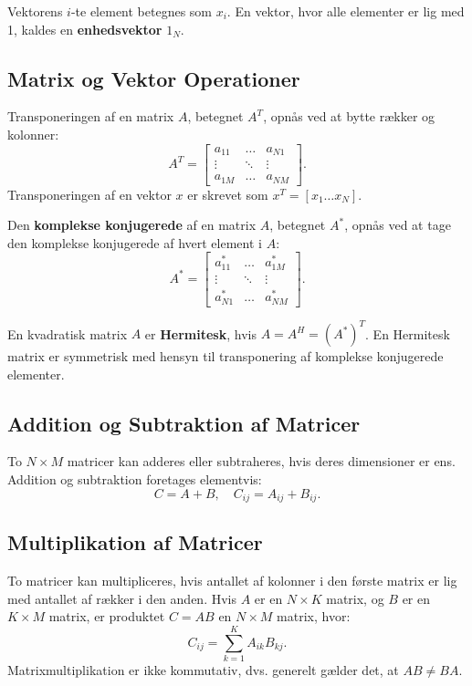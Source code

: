\documentclass[a4paper,12pt]{book}
\begin{document}
	Vektorens \(i\)-te element betegnes som \(x_i\). En vektor, hvor alle elementer er lig med 1, kaldes en \textbf{enhedsvektor} \(1_N\). 
	
	\subsection{Matrix og Vektor Operationer}
	Transponeringen af en matrix \(A\), betegnet \(A^T\), opnås ved at bytte rækker og kolonner:
	\[
	A^T = \begin{bmatrix} 
		a_{11} & \dots & a_{N1} \\
		\vdots & \ddots & \vdots \\
		a_{1M} & \dots & a_{NM} 
	\end{bmatrix}.
	\]
	Transponeringen af en vektor \(x\) er skrevet som \(x^T = [x_1 \dots x_N]\).
	
	Den \textbf{komplekse konjugerede} af en matrix \(A\), betegnet \(A^*\), opnås ved at tage den komplekse konjugerede af hvert element i \(A\):
	\[
	A^* = \begin{bmatrix} 
		a_{11}^* & \dots & a_{1M}^* \\
		\vdots & \ddots & \vdots \\
		a_{N1}^* & \dots & a_{NM}^* 
	\end{bmatrix}.
	\]
	
	En kvadratisk matrix \(A\) er \textbf{Hermitesk}, hvis \(A = A^H = (A^*)^T\). En Hermitesk matrix er symmetrisk med hensyn til transponering af komplekse konjugerede elementer.
	
	\subsection{Addition og Subtraktion af Matricer}
	To \(N \times M\) matricer kan adderes eller subtraheres, hvis deres dimensioner er ens. Addition og subtraktion foretages elementvis:
	\[
	C = A + B, \quad C_{ij} = A_{ij} + B_{ij}.
	\]
	
	\subsection{Multiplikation af Matricer}
	To matricer kan multipliceres, hvis antallet af kolonner i den første matrix er lig med antallet af rækker i den anden. Hvis \(A\) er en \(N \times K\) matrix, og \(B\) er en \(K \times M\) matrix, er produktet \(C = AB\) en \(N \times M\) matrix, hvor:
	\[
	C_{ij} = \sum_{k=1}^{K} A_{ik} B_{kj}.
	\]
	Matrixmultiplikation er ikke kommutativ, dvs. generelt gælder det, at \(AB \neq BA\).
	
\end{document}

